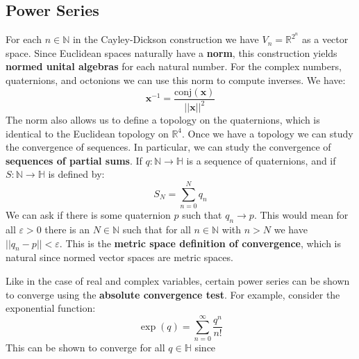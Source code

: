 \documentclass{article}
\theoremstyle{plain}
\theoremstyle{normal}
\begin{document}
        \subsection{Power Series}
            For each $n\in\mathbb{N}$ in the Cayley-Dickson construction
            we have $V_{n}=\mathbb{R}^{2^{n}}$ as a vector space.
            Since Euclidean spaces naturally have a \textbf{norm},
            this construction yields \textbf{normed unital algebras} for each
            natural number. For the complex numbers, quaternions, and
            octonions we can use this norm to compute inverses.
            We have:
            \begin{equation}
                \mathbf{x}^{-1}
                =\frac{\textrm{conj}(\mathbf{x})}{||\mathbf{x}||^{2}}
            \end{equation}
            The norm also allows us to define a topology on the
            quaternions, which is identical to the Euclidean topology on
            $\mathbb{R}^{4}$. Once we have a topology we can study the
            convergence of sequences. In particular, we can study the
            convergence of \textbf{sequences of partial sums}. If
            $q:\mathbb{N}\rightarrow\mathbb{H}$ is a sequence of quaternions,
            and if $S:\mathbb{N}\rightarrow\mathbb{H}$ is defined by:
            \begin{equation}
                S_{N}=\sum_{n=0}^{N}q_{n}
            \end{equation}
            We can ask if there is some quaternion $p$ such that
            $q_{n}\rightarrow{p}$. This would mean for all
            $\varepsilon>0$ there is an $N\in\mathbb{N}$ such that for all
            $n\in\mathbb{N}$ with $n>N$ we have
            $||q_{n}-p||<\varepsilon$. This is the
            \textbf{metric space definition of convergence}, which is natural
            since normed vector spaces are metric spaces.
            \par\hfill\par
            Like in the case of real and complex variables, certain power
            series can be shown to converge using the
            \textbf{absolute convergence test}. For example, consider the
            exponential function:
            \begin{equation}
                \exp(q)
                =\sum_{n=0}^{\infty}\frac{q^{n}}{n!}
            \end{equation}
            This can be shown to converge for all $q\in\mathbb{H}$ since
\end{document}
